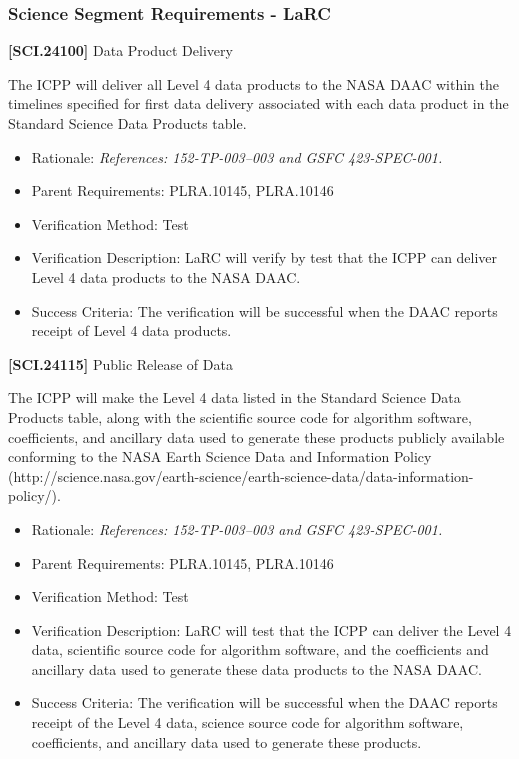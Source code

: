 \documentclass[12pt,oneside,oldfontcommands]{memoir}
\begin{document}
\subsubsection{Science Segment Requirements - LaRC}
\label{sciencesegmentrequirements-larc}

\textbf{[SCI.24100]} Data Product Delivery

The \gls{ICPP} will deliver all Level 4 data products to the NASA \gls{DAAC} within the timelines specified for first data delivery associated with each data product in the Standard Science Data Products table.

\begin{itemize}
\item{} Rationale: \emph{References: 152-TP-003--003 and GSFC 423-SPEC-001.}

\item{} Parent Requirements: PLRA.10145, PLRA.10146

\item{} Verification Method: Test

\item{} Verification Description: \gls{LaRC} will verify by \gls{test} that the \gls{ICPP} can deliver Level 4 data products to the NASA \gls{DAAC}.

\item{} Success Criteria: The verification will be successful when the \gls{DAAC} reports receipt of Level 4 data products.

\end{itemize}

\textbf{[SCI.24115]} Public Release of Data

The \gls{ICPP} will make the Level 4 data listed in the Standard Science Data Products table, along with the scientific source code for algorithm software, coefficients, and ancillary data used to generate these products publicly available conforming to the NASA Earth Science Data and Information Policy (http:\slash \slash science.nasa.gov\slash earth-science\slash earth-science-data\slash data-information-policy\slash ).

\begin{itemize}
\item{} Rationale: \emph{References: 152-TP-003--003 and GSFC 423-SPEC-001.}

\item{} Parent Requirements: PLRA.10145, PLRA.10146

\item{} Verification Method: Test

\item{} Verification Description: \gls{LaRC} will \gls{test} that the \gls{ICPP} can deliver the Level 4 data, scientific source code for algorithm software, and the coefficients and ancillary data used to generate these data products to the NASA \gls{DAAC}.

\item{} Success Criteria: The verification will be successful when the \gls{DAAC} reports receipt of the Level 4 data, science source code for algorithm software, coefficients, and ancillary data used to generate these products.

\end{itemize}
\end{document}
